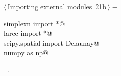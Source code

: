 \documentclass[11pt,oneside]{article}	%
\begin{document}
\begin{flushleft} \small
\begin{minipage}{\linewidth} \label{scrap47}
\protect{}$\langle\,$Importing external modules\nobreak\ {\footnotesize 21b}$\,\rangle\equiv$
\vspace{-1ex}
\begin{list}{}{} \item
\mbox{}\verb@from simplexn import *@\\
\mbox{}\verb@from larcc import *@\\
\mbox{}\verb@from scipy.spatial import Delaunay@\\
\mbox{}\verb@import numpy as np@\\
\mbox{}\verb@@{\NWsep}
\end{list}
\vspace{-1ex}
\footnotesize\addtolength{\baselineskip}{-1ex}
\begin{list}{}{\setlength{\itemsep}{-\parsep}\setlength{\itemindent}{-\leftmargin}}
\item \NWtxtMacroRefIn\ .
\end{list}
\end{minipage}\\[4ex]
\end{flushleft}
\end{document}
